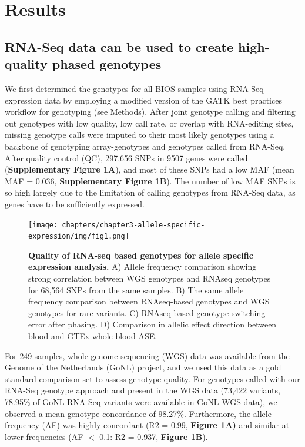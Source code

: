 \section{Results}
\subsection{RNA-Seq data can be used to create high-quality phased genotypes}
We first determined the genotypes for all BIOS samples using RNA-Seq expression data by employing a modified version of the GATK\cite{mckennaGenomeAnalysisToolkit2010} best practices workflow for genotyping (see Methods). After joint genotype calling and filtering out genotypes with low quality, low call rate, or overlap with RNA-editing sites, missing genotype calls were imputed to their most likely genotypes using a backbone of genotyping array-genotypes and genotypes called from RNA-Seq. After quality control (QC), 297,656 SNPs in 9507 genes were called (\textbf{Supplementary Figure 1A}), and most of these SNPs had a low MAF (mean MAF = 0.036, \textbf{Supplementary Figure 1B}). The number of low MAF SNPs is so high largely due to the limitation of calling genotypes from RNA-Seq data, as genes have to be sufficiently expressed.

\begin{figure}[h!]
	\texttt{[image: chapters/chapter3-allele-specific-expression/img/fig1.png]}
	\caption{\textbf{Quality of RNA-seq based genotypes for allele specific expression analysis.} A) Allele frequency comparison showing strong correlation between WGS genotypes and RNAseq genotypes for 68,564 SNPs from the same samples. B) The same allele frequency comparison between RNAseq-based genotypes and WGS genotypes for rare variants. C) RNAseq-based genotype switching error after phasing. D) Comparison in allelic effect direction between blood and GTEx whole blood ASE. }
	\label{ase_fig1}
\end{figure}

For 249 samples, whole-genome sequencing (WGS) data was available from the Genome of the Netherlands (GoNL) project\cite{boomsmaGenomeNetherlandsDesign2014}, and we used this data as a gold standard comparison set to assess genotype quality. For genotypes called with our RNA-Seq genotype approach and present in the WGS data (73,422 variants, 78.95\% of GoNL RNA-Seq variants were available in GoNL WGS data), we observed a mean genotype concordance of 98.27\%. Furthermore, the allele frequency (AF) was highly concordant (R2 = 0.99, \textbf{Figure \ref{ase_fig1}A)} and similar at lower frequencies (AF $<$ 0.1: R2 = 0.937, \textbf{Figure \ref{ase_fig1}B}). 

